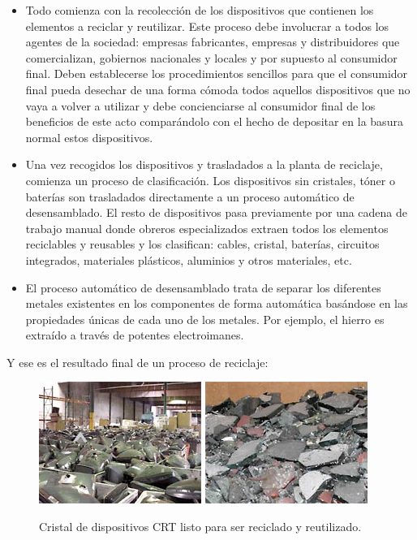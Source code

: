 \begin{itemize}

\item{Todo comienza con la recolección de los dispositivos que contienen los elementos a reciclar y reutilizar. Este proceso debe involucrar a todos los agentes de la sociedad: empresas fabricantes, empresas y distribuidores que comercializan, gobiernos nacionales y locales y por supuesto al consumidor final. Deben establecerse los procedimientos sencillos para que el consumidor final pueda desechar de una forma cómoda todos aquellos dispositivos que no vaya a volver a utilizar y debe concienciarse al consumidor final de los beneficios de este acto comparándolo con el hecho de depositar en la basura normal estos dispositivos.}

\item{Una vez recogidos los dispositivos y trasladados a la planta de reciclaje, comienza un proceso de clasificación. Los dispositivos sin cristales, tóner o baterías son trasladados directamente a un proceso automático de desensamblado. El resto de dispositivos pasa previamente por una cadena de trabajo manual donde obreros especializados extraen todos los elementos reciclables y reusables y los clasifican: cables, cristal, baterías, circuitos integrados, materiales plásticos, aluminios y otros materiales, etc.}

\item{El proceso automático de desensamblado trata de separar los diferentes metales existentes en los componentes de forma automática basándose en las propiedades únicas de cada uno de los metales. Por ejemplo, el hierro es extraído a través de potentes electroimanes.}

\end{itemize}

Y ese es el resultado final de un proceso de reciclaje:

\begin{figure}[H]
\begin{center}
\includegraphics[]{img/ewaste_2}
\includegraphics[]{img/ewaste_4}
\caption{Cristal de dispositivos CRT listo para ser reciclado y reutilizado.}
\end{center}
\end{figure}


